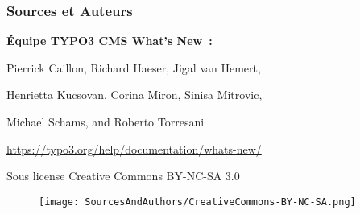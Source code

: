 %

\begin{frame}[fragile]
	\frametitle{Sources et Auteurs}

	\vspace{-0.6cm}

	\centerline{\textbf{Équipe TYPO3 CMS What's New~:}}

	\begin{center}
		\centerline{Pierrick Caillon, Richard Haeser, Jigal van Hemert,}
		\centerline{Henrietta Kucsovan, Corina Miron, Sinisa Mitrovic,}
		\centerline{Michael Schams, and Roberto Torresani}
	\end{center}

	\vspace{0.6cm}

	\smaller\begin{center}\url{https://typo3.org/help/documentation/whats-new/}\end{center}\normalsize

	\vspace{1cm}

	\smaller\begin{center}Sous license Creative Commons BY-NC-SA 3.0\end{center}\normalsize
	\begin{figure}\vspace*{-0.4cm}
		\texttt{[image: SourcesAndAuthors/CreativeCommons-BY-NC-SA.png]}
	\end{figure}

\end{frame}

